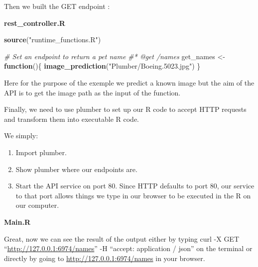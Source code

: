 \documentclass[]{book}
\newenvironment{Shaded}{\begin{snugshade}}{\end{snugshade}}
\newcommand{\CommentTok}[1]{\textcolor[rgb]{0.56,0.35,0.01}{\textit{#1}}}
\newcommand{\ControlFlowTok}[1]{\textcolor[rgb]{0.13,0.29,0.53}{\textbf{#1}}}
\newcommand{\DataTypeTok}[1]{\textcolor[rgb]{0.13,0.29,0.53}{#1}}
\newcommand{\DecValTok}[1]{\textcolor[rgb]{0.00,0.00,0.81}{#1}}
\newcommand{\KeywordTok}[1]{\textcolor[rgb]{0.13,0.29,0.53}{\textbf{#1}}}
\newcommand{\NormalTok}[1]{#1}
\newcommand{\OperatorTok}[1]{\textcolor[rgb]{0.81,0.36,0.00}{\textbf{#1}}}
\newcommand{\StringTok}[1]{\textcolor[rgb]{0.31,0.60,0.02}{#1}}
\providecommand{\tightlist}{%
  \setlength{\itemsep}{0pt}\setlength{\parskip}{0pt}}
\begin{document}
Then we built the GET endpoint :

\textbf{rest\_controller.R}

\begin{Shaded}
\begin{Highlighting}[]
\KeywordTok{source}\NormalTok{(}\StringTok{"runtime_functions.R"}\NormalTok{)}

\CommentTok{# Set an endpoint to return a pet name}
\CommentTok{#* @get /names}
\NormalTok{get_names <-}\StringTok{ }\ControlFlowTok{function}\NormalTok{()\{}
  \KeywordTok{image_prediction}\NormalTok{(}\StringTok{"Plumber/Boeing.5023.jpg"}\NormalTok{)}
\NormalTok{\}}
\end{Highlighting}
\end{Shaded}

Here for the purpose of the exemple we predict a known image but the aim of the API is to get the image path as the input of the function.

Finally, we need to use plumber to set up our R code to accept HTTP requests and transform them into executable R code.

We simply:

\begin{enumerate}
\def\labelenumi{\arabic{enumi}.}
\tightlist
\item
  Import plumber.
\item
  Show plumber where our endpoints are.
\item
  Start the API service on port 80.
  Since HTTP defaults to port 80, our service to that port allows things we type in our browser to be executed in the R on our computer.
\end{enumerate}

\textbf{Main.R}

\begin{Shaded}
\end{Shaded}

Great, now we can see the result of the output either by typing curl -X GET ``\url{http://127.0.0.1:6974/names}'' -H ``accept: application / json'' on the terminal or directly by going to \url{http://127.0.0.1:6974/names} in your browser.
\end{document}
